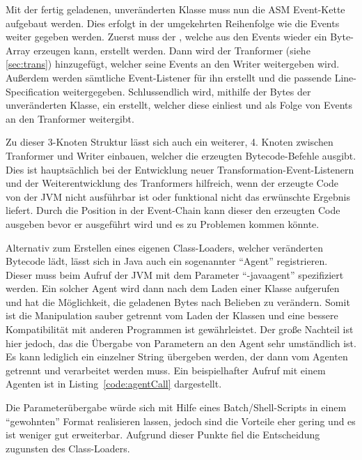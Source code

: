 Mit der fertig geladenen, unveränderten Klasse muss nun die ASM Event-Kette aufgebaut werden. Dies erfolgt in der umgekehrten Reihenfolge wie die Events weiter gegeben werden. Zuerst muss der , welche aus den Events wieder ein Byte-Array erzeugen kann, erstellt werden. Dann wird der Tranformer (siehe \ref{sec:trans}) hinzugefügt, welcher seine Events an den Writer weitergeben wird. Außerdem werden sämtliche Event-Listener für ihn erstellt und die passende Line-Specification weitergegeben. Schlussendlich wird, mithilfe der Bytes der unveränderten Klasse, ein  erstellt, welcher diese einliest und als Folge von Events an den Tranformer weitergibt.

Zu dieser 3-Knoten Struktur lässt sich auch ein weiterer, 4. Knoten zwischen Tranformer und Writer einbauen, welcher die erzeugten Bytecode-Befehle ausgibt. Dies ist hauptsächlich bei der Entwicklung neuer Transformation-Event-Listenern und der Weiterentwicklung des Tranformers hilfreich, wenn der erzeugte Code von der \ac{JVM} nicht ausführbar ist oder funktional nicht das erwünschte Ergebnis liefert. Durch die Position in der Event-Chain kann dieser den erzeugten Code ausgeben bevor er ausgeführt wird und es zu Problemen kommen könnte.

Alternativ zum Erstellen eines eigenen Class-Loaders, welcher veränderten Bytecode lädt, lässt sich in Java auch ein sogenannter "`Agent"' registrieren. Dieser muss beim Aufruf der \ac{JVM} mit dem Parameter "`-javaagent"' spezifiziert werden. Ein solcher Agent wird dann nach dem Laden einer Klasse aufgerufen und hat die Möglichkeit, die geladenen Bytes nach Belieben zu verändern. Somit ist die Manipulation sauber getrennt vom Laden der Klassen und eine bessere Kompatibilität mit anderen Programmen ist gewährleistet. Der große Nachteil ist hier jedoch, das die Übergabe von Parametern an den Agent sehr umständlich ist. Es kann lediglich ein einzelner String übergeben werden, der dann vom Agenten getrennt und verarbeitet werden muss. \cite{agent_arg_stack} Ein beispielhafter Aufruf mit einem Agenten ist in Listing~\ref{code:agentCall} dargestellt.

 

Die Parameterübergabe würde sich mit Hilfe eines Batch/Shell-Scripts in einem "`gewohnten"' Format realisieren lassen, jedoch sind die Vorteile eher gering und es ist weniger gut erweiterbar. Aufgrund dieser Punkte fiel die Entscheidung zugunsten des Class-Loaders.

